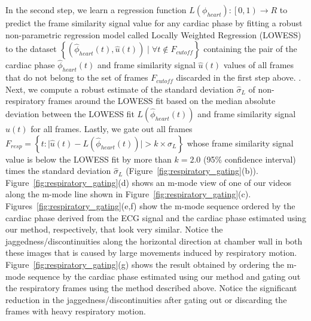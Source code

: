 \documentclass[journal]{IEEEtran}
\newcommand{\rk}[1]{{\color{blue}{#1}}}
\begin{document}
In the second step, we learn a regression function $L(\phi_{heart}) : \left [  0, 1\right ) \to R$ to predict the frame similarity signal value for any cardiac phase by fitting a robust non-parametric regression model called Locally Weighted Regression (LOWESS)~\cite{Cleveland1988} to the dataset $\left \{ \left(\hat{\phi}_{heart}(t), \hat{u}(t) \right) \mid \forall t \notin F_{cutoff}  \right \}$ containing the pair of the cardiac phase $\hat{\phi}_{heart}(t)$ and frame similarity signal $\hat{u}(t)$  values of all frames that do not belong to the set of frames $F_{cutoff}$ discarded in the first step above. \rk{Given any cardiac phase, LOWESS regression takes k-nearest training samples based on their cardiac phase values and uses  iterative weighted linear regression to predict the corresponding frame similarity signal value. This local fitting approach enables LOWESS regression to model a much wider class of functions than is possible with parametric approaches such as polynomial regression}. Next, we compute a robust estimate of the standard deviation $\hat{\sigma}_{L}$ of non-respiratory frames around the LOWESS fit based on the median absolute deviation between the LOWESS fit $L( \hat{\phi}_{heart}(t) )$ and frame similarity signal $\hat{u}(t)$ for all frames. Lastly, we gate out all frames $F_{resp} = \left \{ t : \lvert \hat{u}(t) - L( \hat{\phi}_{heart}(t) ) \rvert   > k \times \hat{\sigma}_{L}  \right \}$ whose frame similarity signal value is below the LOWESS fit by more than $k = 2.0$ (95\% confidence interval) times the standard deviation $\hat{\sigma}_{L}$ (Figure~\ref{fig:respiratory_gating}(b)). Figure~\ref{fig:respiratory_gating}(d) shows an m-mode view of one of our videos along the m-mode line shown in Figure~\ref{fig:respiratory_gating}(c). Figures~\ref{fig:respiratory_gating}(e,f) show the m-mode sequence ordered by the cardiac phase derived from the ECG signal and the cardiac phase estimated using our method, respectively, that look very similar. Notice the jaggedness/discontinuities along the horizontal direction at chamber wall in both these images that is caused by large movements induced by respiratory motion. Figure~\ref{fig:respiratory_gating}(g) shows the result obtained by ordering the m-mode sequence by the cardiac phase estimated using our method and gating out the respiratory frames using the method described above. Notice the significant reduction in the jaggedness/discontinuities after gating out or discarding the frames with heavy respiratory motion.
%
\end{document}
